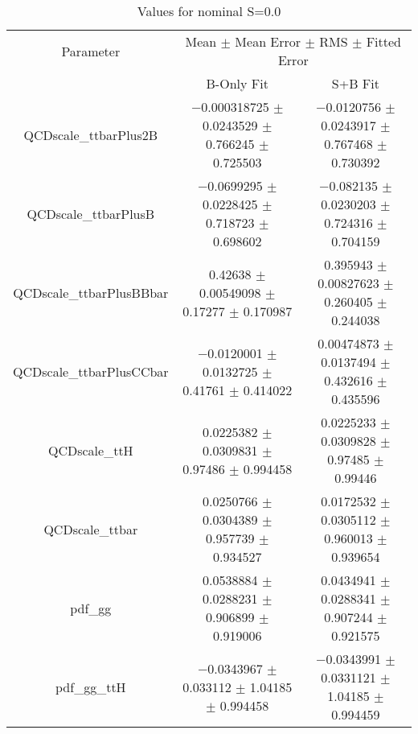 \begin{table}
\centering
\caption{Values for nominal S=0.0}
\begin{tabular}{ccc}
\toprule
Parameter & \multicolumn{2}{c}{Mean $\pm$ Mean Error $\pm$ RMS $\pm$ Fitted Error}\\
 & B-Only Fit & S+B Fit\\
\midrule
QCDscale\_ttbarPlus2B & \num{-0.000318725} $\pm$ \num{0.0243529} $\pm$ \num{0.766245} $\pm$ \num{0.725503} & \num{-0.0120756} $\pm$ \num{0.0243917} $\pm$ \num{0.767468} $\pm$ \num{0.730392}\\
QCDscale\_ttbarPlusB & \num{-0.0699295} $\pm$ \num{0.0228425} $\pm$ \num{0.718723} $\pm$ \num{0.698602} & \num{-0.082135} $\pm$ \num{0.0230203} $\pm$ \num{0.724316} $\pm$ \num{0.704159}\\
QCDscale\_ttbarPlusBBbar & \num{0.42638} $\pm$ \num{0.00549098} $\pm$ \num{0.17277} $\pm$ \num{0.170987} & \num{0.395943} $\pm$ \num{0.00827623} $\pm$ \num{0.260405} $\pm$ \num{0.244038}\\
QCDscale\_ttbarPlusCCbar & \num{-0.0120001} $\pm$ \num{0.0132725} $\pm$ \num{0.41761} $\pm$ \num{0.414022} & \num{0.00474873} $\pm$ \num{0.0137494} $\pm$ \num{0.432616} $\pm$ \num{0.435596}\\
QCDscale\_ttH & \num{0.0225382} $\pm$ \num{0.0309831} $\pm$ \num{0.97486} $\pm$ \num{0.994458} & \num{0.0225233} $\pm$ \num{0.0309828} $\pm$ \num{0.97485} $\pm$ \num{0.99446}\\
QCDscale\_ttbar & \num{0.0250766} $\pm$ \num{0.0304389} $\pm$ \num{0.957739} $\pm$ \num{0.934527} & \num{0.0172532} $\pm$ \num{0.0305112} $\pm$ \num{0.960013} $\pm$ \num{0.939654}\\
pdf\_gg & \num{0.0538884} $\pm$ \num{0.0288231} $\pm$ \num{0.906899} $\pm$ \num{0.919006} & \num{0.0434941} $\pm$ \num{0.0288341} $\pm$ \num{0.907244} $\pm$ \num{0.921575}\\
pdf\_gg\_ttH & \num{-0.0343967} $\pm$ \num{0.033112} $\pm$ \num{1.04185} $\pm$ \num{0.994458} & \num{-0.0343991} $\pm$ \num{0.0331121} $\pm$ \num{1.04185} $\pm$ \num{0.994459}\\
\bottomrule
\end{tabular}
\end{table}